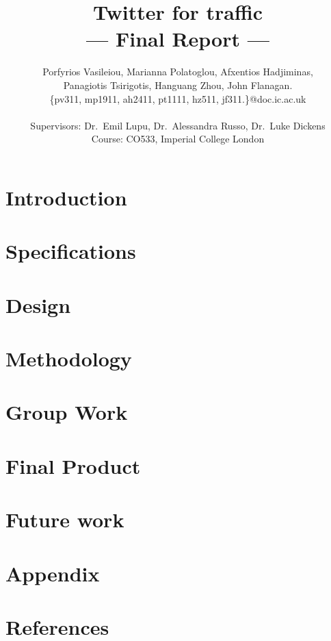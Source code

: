 \documentclass[a4paper,11pt]{article}
\title{Twitter for traffic\\\Large{--- Final Report ---}}
\author{Porfyrios Vasileiou, Marianna Polatoglou, Afxentios Hadjiminas,\\
        Panagiotis Tsirigotis, Hanguang Zhou, John Flanagan.\\
       \{pv311, mp1911, ah2411, pt1111, hz511, jf311.\}@doc.ic.ac.uk\\ \\
       \small{Supervisors: Dr.\ Emil Lupu, Dr.\ Alessandra Russo, Dr.\ Luke Dickens}\\
       \small{Course: CO533, Imperial College London}
}
\begin{document}
\maketitle
\pagebreak
\tableofcontents
\pagebreak
\section{Introduction}
	

\pagebreak
\section{Specifications}
	

\pagebreak
\section{Design}
	

\pagebreak
\section{Methodology}
	

\pagebreak
\section{Group Work}
	
	
\pagebreak
\section{Final Product}
	


\pagebreak
\section{Future work}
    
\pagebreak

\section{Appendix}
	

\pagebreak	
\section{References}
	\vspace{-20pt}
	\def\refname{}
	
	
\end{document}
